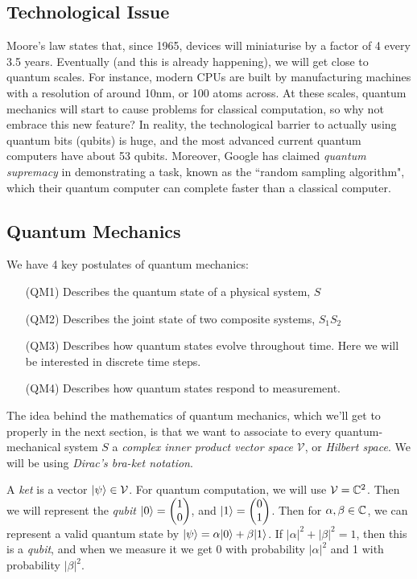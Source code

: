 \documentclass[10pt,a4paper]{article}
\begin{document}
\subsection{Technological Issue}
Moore's law states that, since 1965, devices will miniaturise by a factor of 4 every 3.5 years. Eventually (and this is already happening), we will get close to quantum scales. For instance, modern CPUs are built by manufacturing machines with a resolution of around 10nm, or 100 atoms across. At these scales, quantum mechanics will start to cause problems for classical computation, so why not embrace this new feature? In reality, the technological barrier to actually using quantum bits (qubits) is huge, and the most advanced current quantum computers have about 53 qubits. Moreover, Google has claimed \emph{quantum supremacy} in demonstrating a task, known as the ``random sampling algorithm", which their quantum computer can complete faster than a classical computer.

\subsection{Quantum Mechanics}
We have 4 key postulates of quantum mechanics:
\begin{itemize}
\item[(QM1)] Describes the quantum state of a physical system, $S$
\item[(QM2)] Describes the joint state of two composite systems, $S_1S_2$
\item[(QM3)] Describes how quantum states evolve throughout time. Here we will be interested in discrete time steps.
\item[(QM4)] Describes how quantum states respond to measurement.
\end{itemize}
The idea behind the mathematics of quantum mechanics, which we'll get to properly in the next section, is that we want to associate to every quantum-mechanical system $S$ a \emph{complex inner product vector space} $\mathcal{V}$, or \emph{Hilbert space}. We will be using \emph{Dirac's bra-ket notation}.

A \emph{ket} is a vector $|\psi\rangle \in \mathcal{V}$. For quantum computation, we will use $\mathcal{V} = \mathbb{C}^2$. Then we will represent the \emph{qubit} $|0\rangle = \begin{pmatrix} 1 \\ 0\end{pmatrix}$, and $|1\rangle = \begin{pmatrix} 0 \\ 1 \end{pmatrix}$. Then for $\alpha, \beta \in \mathbb{C}$, we can represent a valid quantum state by $|\psi\rangle = \alpha|0\rangle + \beta|1\rangle$. If $|\alpha|^2 + |\beta|^2 = 1$, then this is a \emph{qubit}, and when we measure it we get 0 with probability $|\alpha|^2$ and 1 with probability $|\beta|^2$.
\end{document}
